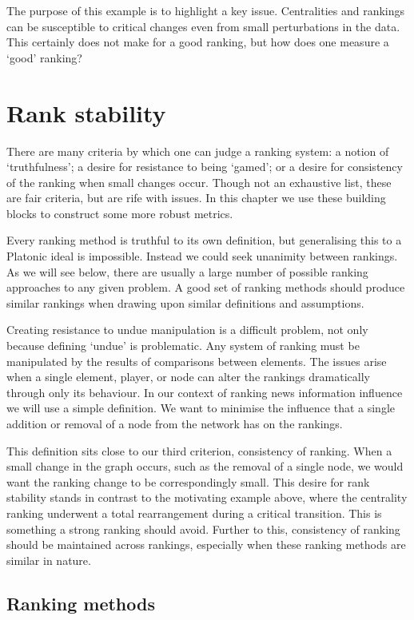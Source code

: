 The purpose of this example is to highlight a key issue. Centralities and rankings can be susceptible to critical changes even from small perturbations in the data. This certainly does not make for a good ranking, but how does one measure a `good' ranking?


\section{Rank stability}

There are many criteria by which one can judge a ranking system: a notion of `truthfulness'; a desire for resistance to being `gamed'; or a desire for consistency of the ranking when small changes occur. Though not an exhaustive list, these are fair criteria, but are rife with issues. In this chapter we use these building blocks to construct some more robust metrics.

Every ranking method is truthful to its own definition, but generalising this to a Platonic ideal is impossible. Instead we could seek unanimity between rankings. As we will see below, there are usually a large number of possible ranking approaches to any given problem. A good set of ranking methods should produce similar rankings when drawing upon similar definitions and assumptions.

Creating resistance to undue manipulation is a difficult problem, not only because defining `undue' is problematic. Any system of ranking must be manipulated by the results of comparisons between elements. The issues arise when a single element, player, or node can alter the rankings dramatically through only its behaviour. In our context of ranking news information influence we will use a simple definition. We want to minimise the influence that a single addition or removal of a node from the network has on the rankings.

This definition sits close to our third criterion, consistency of ranking. When a small change in the graph occurs, such as the removal of a single node, we would want the ranking change to be correspondingly small. This desire for rank stability stands in contrast to the motivating example above, where the centrality ranking underwent a total rearrangement during a critical transition. This is something a strong ranking should avoid. Further to this, consistency of ranking should be maintained across rankings, especially when these ranking methods are similar in nature. 


\subsection{Ranking methods}


